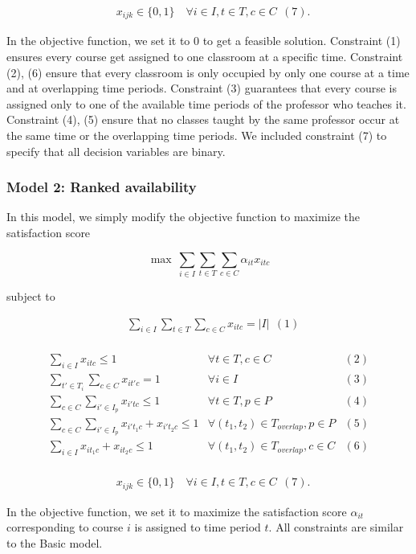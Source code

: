 \documentclass{article}
\begin{document}
$$
\begin{aligned}
& x_{i j k} \in\{0,1\} \quad \forall i \in I, t \in T, c \in C \ \ (7).
\end{aligned}
$$

In the objective function, we set it to 0 to get a feasible solution. Constraint (1) ensures every course get assigned to one classroom at a specific time. Constraint (2), (6) ensure that every classroom is only occupied by only one course at a time and at overlapping time periods. Constraint (3) guarantees that every course is assigned only to one of the available time periods of the professor who teaches it. Constraint (4), (5) ensure that no classes taught by the same professor occur at the same time or the overlapping time periods. We included constraint (7) to specify that all decision variables are binary.

\subsubsection{Model 2: Ranked availability}

In this model, we simply modify the objective function to maximize the satisfaction score

$$
\max \ \sum_{i \in I} \sum_{t \in T} \sum_{c \in C} \alpha_{i t} x_{i t c}
$$

subject to

$$
\begin{aligned}
  & \sum_{i \in I} \sum_{t \in T} \sum_{c \in C} x_{i t c}=|I| \ \ (1) \\
\end{aligned}
$$

$$
\begin{array}{lll}
\sum_{i \in I} x_{i t c} \leq 1 & \forall t \in T, c \in C & (2)\\
\sum_{t' \in T_i} \sum_{c \in C} x_{i t' c}=1 & \forall i \in I & (3)\\
\sum_{c \in C} \sum_{i' \in I_p} x_{i' t c} \leq 1 & \forall t \in T, p \in P & (4)\\
\sum_{c \in C} \sum_{i' \in I_p} x_{i' t_1 c} + x_{i' t_2 c} \leq 1 & \forall (t_1, t_2) \in T_{overlap}, p \in P & (5)\\
\sum_{i \in I} x_{i t_1 c} + x_{i t_2 c} \leq 1 & \forall (t_1, t_2) \in T_{overlap}, c \in C & (6)\\
\end{array}
$$


$$
\begin{aligned}
& x_{i j k} \in\{0,1\} \quad \forall i \in I, t \in T, c \in C \ \ (7).
\end{aligned}
$$

In the objective function, we set it to maximize the satisfaction score $\alpha_{it}$ corresponding to course $i$ is assigned to time period $t$. All constraints are similar to the Basic model.
\end{document}
